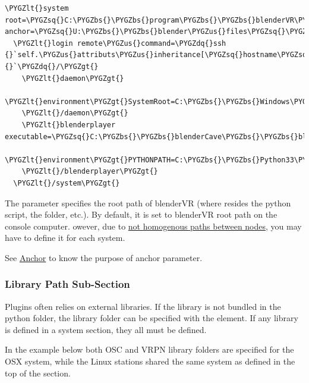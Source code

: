 \documentclass[a4,10pt,openany,oneside]{sphinxmanual}
\def\PYGZbs{\char`\\}
\def\PYGZus{\char`\_}
\def\PYGZlt{\char`\<}
\def\PYGZgt{\char`\>}
\def\PYGZsq{\char`\'}
\def\PYGZdq{\char`\"}
\begin{document}
\begin{Verbatim}[commandchars=\\\{\}]
\PYGZlt{}system root=\PYGZsq{}C:\PYGZbs{}\PYGZbs{}program\PYGZbs{}\PYGZbs{}blenderVR\PYGZsq{} anchor=\PYGZsq{}U:\PYGZbs{}\PYGZbs{}blender\PYGZus{}files\PYGZsq{}\PYGZgt{}
  \PYGZlt{}login remote\PYGZus{}command=\PYGZdq{}ssh {}`self.\PYGZus{}attributs\PYGZus{}inheritance[\PYGZsq{}hostname\PYGZsq{}]{}`\PYGZdq{}/\PYGZgt{}
    \PYGZlt{}daemon\PYGZgt{}
      \PYGZlt{}environment\PYGZgt{}SystemRoot=C:\PYGZbs{}\PYGZbs{}Windows\PYGZlt{}/environment\PYGZgt{}
    \PYGZlt{}/daemon\PYGZgt{}
    \PYGZlt{}blenderplayer executable=\PYGZsq{}C:\PYGZbs{}\PYGZbs{}blenderCave\PYGZbs{}\PYGZbs{}blender\PYGZbs{}\PYGZbs{}v2.70a\PYGZbs{}\PYGZbs{}blenderplayer.exe\PYGZsq{}\PYGZgt{}
      \PYGZlt{}environment\PYGZgt{}PYTHONPATH=C:\PYGZbs{}\PYGZbs{}Python33\PYGZbs{}\PYGZbs{}Lib;\PYGZlt{}/environment\PYGZgt{}
    \PYGZlt{}/blenderplayer\PYGZgt{}
  \PYGZlt{}/system\PYGZgt{}
\end{Verbatim}

The  parameter specifies the root path of blenderVR (where resides the  python script, the  folder, etc.). By default, it is set to blenderVR root path on the console computer.
owever, due to {\hyperref[components/configuration-file:anchor]{not homogenous paths between nodes}}, you may have to define it for each system.

See {\hyperref[components/configuration-file:anchor]{Anchor}} to know the purpose of anchor parameter.


\subsubsection{Library Path Sub-Section}
\label{components/configuration-file:library-path-sub-section}
Plugins often relies on external libraries. If the library is not bundled in the  python folder, the library folder can be specified with the  element.
If any library is defined in a system section, they all must be defined.

In the example below both OSC and VRPN library folders are specified for the OSX system, while the Linux stations shared the same system as defined in the top of the  section.
\end{document}
